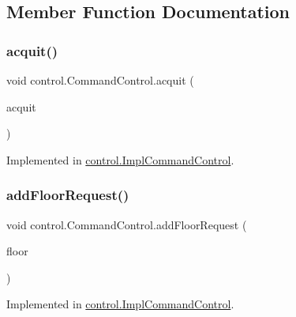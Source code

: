 \subsection{Member Function Documentation}
\mbox{\label{interfacecontrol_1_1_command_control_a7eb9b7d638a4680fdf89453ca16a6c93}} 
\subsubsection{\texorpdfstring{acquit()}{acquit()}}
{\footnotesize\ttfamily void control.\+Command\+Control.\+acquit (\begin{DoxyParamCaption}\item[{\mbox{\hyperlink{classcontrol_1_1command_1_1_acquit}{Acquit}}}]{acquit }\end{DoxyParamCaption})}



Implemented in \mbox{\hyperlink{classcontrol_1_1_impl_command_control_a18ba4e8d7e7b6ebfec099c22f58d55d1}{control.\+Impl\+Command\+Control}}.

\mbox{\label{interfacecontrol_1_1_command_control_addb1fea724cbd015456ac62a1dcf556d}} 
\subsubsection{\texorpdfstring{addFloorRequest()}{addFloorRequest()}}
{\footnotesize\ttfamily void control.\+Command\+Control.\+add\+Floor\+Request (\begin{DoxyParamCaption}\item[{\mbox{\hyperlink{classcontrol_1_1command_1_1_floor_request}{Floor\+Request}}}]{floor }\end{DoxyParamCaption})}



Implemented in \mbox{\hyperlink{classcontrol_1_1_impl_command_control_a992b195b4521cba044f235fa35f6a9b2}{control.\+Impl\+Command\+Control}}.

\mbox{\label{interfacecontrol_1_1_command_control_a9a32457770712105c8ceffab1c05b95a}} 
